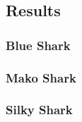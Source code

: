 \documentclass[12pt]{SCreport}
\begin{document}
      \subsection{Results}
      \clearpage
  \subsubsection{Blue Shark}
           




 



 \subsubsection{Mako Shark}
          



\clearpage
 \subsubsection{Silky Shark}
 
\end{document}
